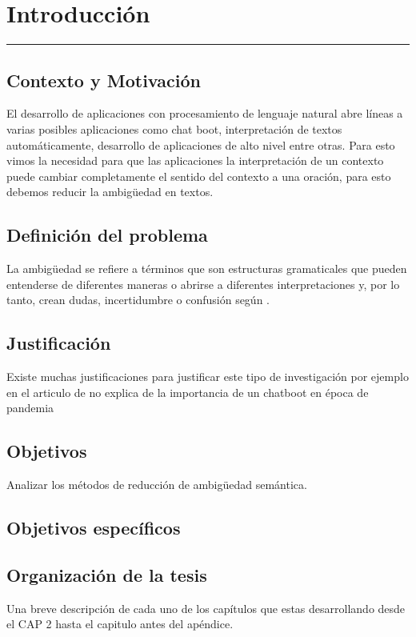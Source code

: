 \chapter{Introducción}
\hrule \bigskip \vspace*{1cm}
\section{Contexto y Motivación}
El desarrollo de aplicaciones con procesamiento de lenguaje natural abre líneas a varias posibles aplicaciones como chat boot, interpretación de textos automáticamente, desarrollo de aplicaciones de alto nivel entre otras. Para esto vimos la necesidad para que las aplicaciones la interpretación de un contexto puede cambiar completamente el sentido del contexto a una oración, para esto debemos reducir la ambigüedad en textos.

\section{Definición del problema}
La ambigüedad se refiere a términos que son estructuras gramaticales que pueden entenderse de diferentes maneras o abrirse a diferentes interpretaciones y, por lo tanto, crean dudas, incertidumbre o confusión según \cite{EvaluacionAmbiguedad01}.

\section{Justificación}

Existe muchas justificaciones para justificar este tipo de investigación por ejemplo en el articulo de \cite{ChatBoot} no explica de la importancia de un chatboot en época de pandemia


\section{Objetivos}

 Analizar los métodos de reducción de ambigüedad semántica.

\section{Objetivos específicos}


\section{Organización de la tesis}

Una breve descripción de cada uno de los capítulos que estas
desarrollando desde el CAP 2 hasta el capitulo antes del apéndice.
